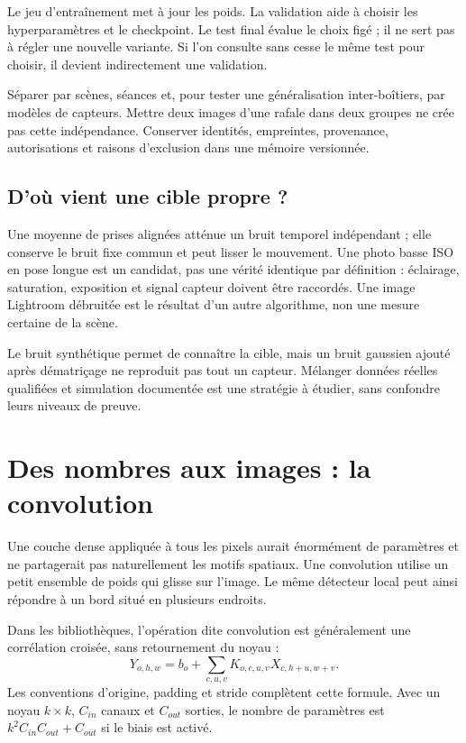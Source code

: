 \documentclass[12pt,a4paper,oneside]{report}
\begin{document}
Le jeu d'entraînement met à jour les poids. La validation aide à choisir les
hyperparamètres et le checkpoint. Le test final évalue le choix figé ; il ne
sert pas à régler une nouvelle variante. Si l'on consulte sans cesse le même
test pour choisir, il devient indirectement une validation.

Séparer par scènes, séances et, pour tester une généralisation inter-boîtiers,
par modèles de capteurs. Mettre deux images d'une rafale dans deux groupes ne
crée pas cette indépendance. Conserver identités, empreintes, provenance,
autorisations et raisons d'exclusion dans une mémoire versionnée.

\section{D'où vient une cible propre ?}

Une moyenne de prises alignées atténue un bruit temporel indépendant ; elle
conserve le bruit fixe commun et peut lisser le mouvement. Une photo basse ISO
en pose longue est un candidat, pas une vérité identique par définition :
éclairage, saturation, exposition et signal capteur doivent être raccordés.
Une image Lightroom débruitée est le résultat d'un autre algorithme, non une
mesure certaine de la scène.

Le bruit synthétique permet de connaître la cible, mais un bruit gaussien
ajouté après dématriçage ne reproduit pas tout un capteur. Mélanger données
réelles qualifiées et simulation documentée est une stratégie à étudier,
sans confondre leurs niveaux de preuve.

\chapter{Des nombres aux images : la convolution}

Une couche dense appliquée à tous les pixels aurait énormément de paramètres
et ne partagerait pas naturellement les motifs spatiaux. Une convolution utilise
un petit ensemble de poids qui glisse sur l'image. Le même détecteur local peut
ainsi répondre à un bord situé en plusieurs endroits.

Dans les bibliothèques, l'opération dite convolution est généralement une
corrélation croisée, sans retournement du noyau :
\[
 Y_{o,h,w}=b_o+\sum_{c,u,v}K_{o,c,u,v}X_{c,h+u,w+v}.
\]
Les conventions d'origine, padding et stride complètent cette formule. Avec
un noyau $k\times k$, $C_{in}$ canaux et $C_{out}$ sorties, le nombre de
paramètres est $k^2C_{in}C_{out}+C_{out}$ si le biais est activé.
\end{document}
